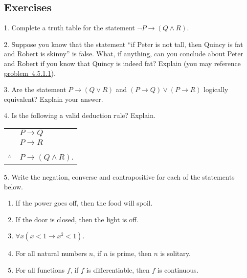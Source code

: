 \documentclass[10pt,]{book}
\theoremstyle{plain}
\theoremstyle{definition}
\theoremstyle{definition}
\theoremstyle{definition}
\numberwithin{equation}{chapter}
\newcommand{\hrulethin}  {\noalign{\hrule height 0.04em}}
\def\imp{\rightarrow}
\newcommand{\lt}{ < }
\begin{document}
\subsection[Exercises]{Exercises}\label{exercises-23}
\begin{exerciselist}
\item[1.]\hypertarget{tt}{}
            Complete a truth table for the statement \(\neg P \imp (Q \wedge R)\).
\par\smallskip
\item[2.]\hypertarget{exercise-245}{}
            Suppose you know that the statement ``if Peter is not tall, then Quincy is fat and Robert is skinny'' is false. What, if anything, can you conclude about Peter and Robert if you know that Quincy is indeed fat? Explain (you may reference
            \hyperlink{tt}{problem~4.5.1.1}).
\par\smallskip
\item[3.]\hypertarget{exercise-246}{}
            Are the statement \(P \imp (Q \vee R)\) and \((P \imp Q) \vee (P \imp R)\) logically equivalent? Explain your answer.
\par\smallskip
\item[4.]\hypertarget{exercise-247}{}
            Is the following a valid deduction rule? Explain.
\begin{tabular}{ll}
&\(P \imp Q\)\tabularnewline[0pt]
&\(P\imp R\)\tabularnewline[0pt]
&\tabularnewline\hrulethin
\(\therefore\)&\(P \imp (Q \wedge R)\).
\end{tabular}
\par\smallskip
\item[5.]\hypertarget{exercise-248}{}
            Write the negation, converse and contrapositive for each of the statements below.
\leavevmode%
\begin{enumerate}[label=(\alph*)]
\item\hypertarget{li-1119}{}
                If the power goes off, then the food will spoil.
\item\hypertarget{li-1120}{}
                If the door is closed, then the light is off.
\item\hypertarget{li-1121}{}\(\forall x (x \lt  1 \imp x^2 \lt  1)\).%
\item\hypertarget{li-1122}{}
                For all natural numbers \(n\), if \(n\) is prime, then \(n\) is solitary.
\item\hypertarget{li-1123}{}
                For all functions \(f\), if \(f\) is differentiable, then \(f\) is continuous.

\end{enumerate}
\end{exerciselist}
\end{document}

